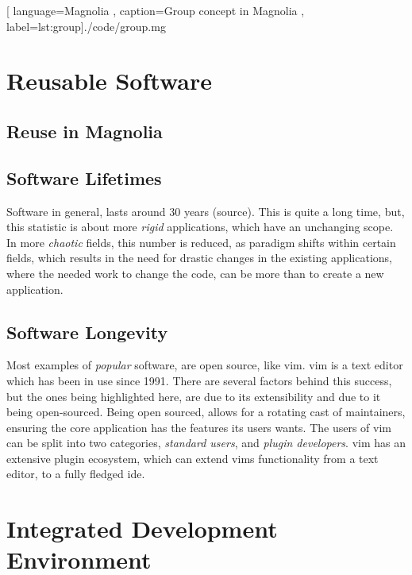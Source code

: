 \begin{center}
  
    [ language=Magnolia
    , caption={Group concept in Magnolia}
    , label=lst:group]{./code/group.mg}
\end{center}

\section{Reusable Software}

\subsection{Reuse in Magnolia}

\subsection{Software Lifetimes}

Software in general, lasts around 30 years (source). This is quite a long time,
but, this statistic is about more \textit{rigid} applications, which have an
unchanging scope. In more \textit{chaotic} fields, this number is reduced, as
paradigm shifts within certain fields, which results in the need for drastic
changes in the existing applications, where the needed work to change the code,
can be more than to create a new application.

\subsection{Software Longevity}

Most examples of \textit{popular} software, are open source, like \gls{vim}.
\gls{vim} is a text editor which has been in use since 1991. There are several
factors behind this success, but the ones being highlighted here, are due to its
extensibility and due to it being open-sourced. Being open sourced, allows for a
rotating cast of maintainers, ensuring the core application has the features its
users wants. The users of \gls{vim} can be split into two categories,
\textit{standard users}, and \textit{plugin developers}. \gls{vim} has an
extensive plugin ecosystem, which can extend \gls{vim}s functionality from a
text editor, to a fully fledged \gls{ide}.

\section{Integrated Development Environment}


